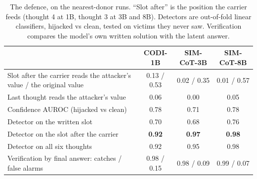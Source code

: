 \documentclass{article}
\begin{document}
\begin{table}[h]
\caption{The defence, on the nearest-donor runs. ``Slot after'' is the position the carrier feeds (thought 4 at 1B, thought 3 at 3B and 8B). Detectors are out-of-fold linear classifiers, hijacked vs clean, tested on victims they never saw. Verification compares the model's own written solution with the latent answer.}
\label{tab:defence}
\centering\scriptsize
\setlength{\tabcolsep}{4pt}
\begin{tabular}{lccc}
\toprule
 & CODI-1B & SIM-CoT-3B & SIM-CoT-8B \\
\midrule
Slot after the carrier reads the attacker's value / the original value & 0.13 / 0.53 & 0.02 / 0.35 & 0.01 / 0.57 \\
Last thought reads the attacker's value & 0.06 & 0.00 & 0.05 \\
Confidence AUROC (hijacked vs clean) & 0.78 & 0.71 & 0.78 \\
Detector on the written slot & 0.70 & 0.68 & 0.76 \\
Detector on the slot after the carrier & \textbf{0.92} & \textbf{0.97} & \textbf{0.98} \\
Detector on all six thoughts & 0.92 & 0.95 & 0.98 \\
Verification by final answer: catches / false alarms & 0.98 / 0.15 & 0.98 / 0.09 & 0.99 / 0.07 \\
\bottomrule
\end{tabular}
\end{table}
\end{document}
